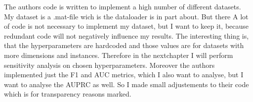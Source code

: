 The authors code is written to implement a high number of different datasets.
My dataset is a .mat-file wich is the dataloader is in part about.
But there 
A lot of code is not necessary to implement my dataset, but I want to keep it, because redundant code will not negatively influence my results.
The interesting thing is, that the hyperparameters are hardcoded and those values are for datasets with more dimensions and instances.
Therefore in the nextchapter I will perform sensitivity analysis on chosen hyperparameters.
Moreover the authors implemented just the F1 and AUC metrics, which I also want to analyse, but I want to analyse the AUPRC as well.
So I made small adjustements to their code which is for transparency reasons marked.

